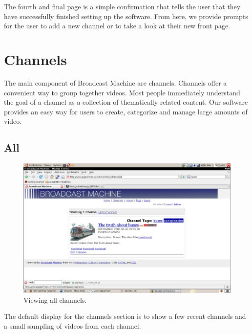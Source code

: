 \documentclass[a4paper,12pt]{report}
\begin{document}
The fourth and final page is a simple confirmation that tells the user that they have successfully finished setting up the software.
From here, we provide prompts for the user to add a new channel or to take a look at their new front page.

\section{Channels}
The main component of Broadcast Machine are channels.
Channels offer a convenient way to group together videos.
Most people immediately understand the goal of a channel as a collection of thematically related content.
Our software provides an easy way for users to create, categorize and manage large amounts of video.

\subsection{All}
\begin{figure}[h]
\begin{center}
\includegraphics[width=150mm]{./images/channelall.png}
\end{center}
\caption{Viewing all channels.}
\end{figure}

The default display for the channels section is to show a few recent channels and a small sampling of videos from each channel.
\end{document}
